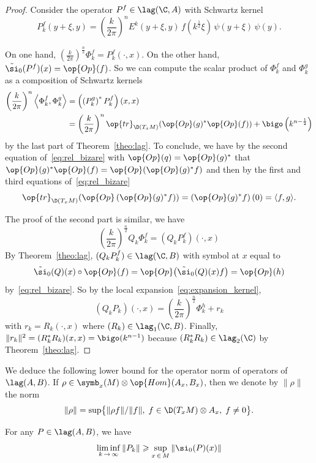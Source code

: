 \begin{proof}
Consider the operator $P^f \in \lag (\C, A)$ with Schwartz
kernel 
\[
P^f_k (y+ \xi, y) = \left(\frac{k}{2\pi} \right)^n E^k (y+ \xi, y) \, f 
\left(k^{\frac{1}{2}} \xi\right)\, \psi (y+ \xi) \, \psi (y).
\]

On one hand, $(\frac{k}{2\pi})^{\frac{n}{2}} \Phi^f_k = P_k^f (\cdot,x)$. On the other hand, $\tilde{\si}_0(P^f)(x) = \op{Op} (f)$. So we can compute the scalar product of $\Phi^f_k$ and $\Phi^g_k$ as a composition of Schwartz kernels
\begin{align*}
\left (\frac{k}{2\pi} \right)^n \left\langle \Phi_k^f, \Phi_k^g \right\rangle & = \left(\left(P_k^g\right)^* P_k^f\right)(x,x) \\
& = \left(\frac{k}{2\pi} \right)^n \op{tr}_{\D (T_xM)} (\op{Op} (g)^*
\op{Op} (f)) + \bigo \left(k^{n-\frac{1}{2}}\right)
\end{align*}
by the last part of Theorem~\ref{theo:lag}.  To conclude, we have by the second equation of~\eqref{eq:rel_bizare} with $\op{Op} (q) = \op{Op} (g)^*$ that $ \op{Op} (g)^* \op{Op} (f) = \op{Op} (\op{Op} (g)^* f) $ and then by the first and third equations of~\eqref{eq:rel_bizare}
\[
\op{tr}_{\D \left(T_xM\right)} (\op{Op} \left(\op{Op} (g)^* f)\right) = \left(\op{Op} (g)^* f\right)(0)
= \langle f, g \rangle.
\]

The proof of the second part is similar, we have
\[
\left(\frac{k}{2\pi} \right)^{\frac{n}{2}} Q_k \Phi^f_k = \left(Q_k
P_k^f\right)(\cdot, x)
\]
By Theorem~\ref{theo:lag}, $(Q_k P_k^f) \in \lag (\C,B)$ with symbol at $x$
equal to
\[
\tilde{\si}_0 (Q) (x) \circ \op{Op} (f)
= \op{Op} \big(\tilde{\si}_0 (Q) (x) f\big) = \op{Op} (h)
\]
by~\eqref{eq:rel_bizare}.  So by the local expansion~\eqref{eq:expansion_kernel},
\[
\left(Q_k P_k\right)(\cdot,x) = \left(\frac{k}{2\pi} \right)^{\frac{n}{2}} \Phi_k^h + r_k
\]
with $r_k =R_{k} (\cdot, x)$ where $(R_{k}) \in \lag_ 1 (\C,B)$. Finally, $\| r_k \|^2 = (R_k^* R_k) (x,x) = \bigo (k^{n-1})$ because $(R_k^*R_k) \in
\lag_2 (\C)$ by Theorem~\ref{theo:lag}. 
\end{proof}

We deduce the following lower bound for the operator norm of operators of $\lag (A,B)$. If $\rho \in \symb_x (M) \otimes \op{Hom} (A_x, B_x)$, then we denote by $\| \rho \|$ the norm
\[
\| \rho \| = \sup \bigl\{ \| \rho f \| / \| f \|,\; f \in \D (T_xM)
\otimes A_x, \; f \neq 0 \bigr\}.
\]


\begin{coro} \label{cor:norm_estim}
For any $P \in \lag (A,B)$, we have
\[
\liminf_{k\,\rightarrow\,\infty} \| P_k \| \geqslant \sup_{x\,\in\,M} \|
\si_0 (P)(x) \|
\]
\end{coro}

